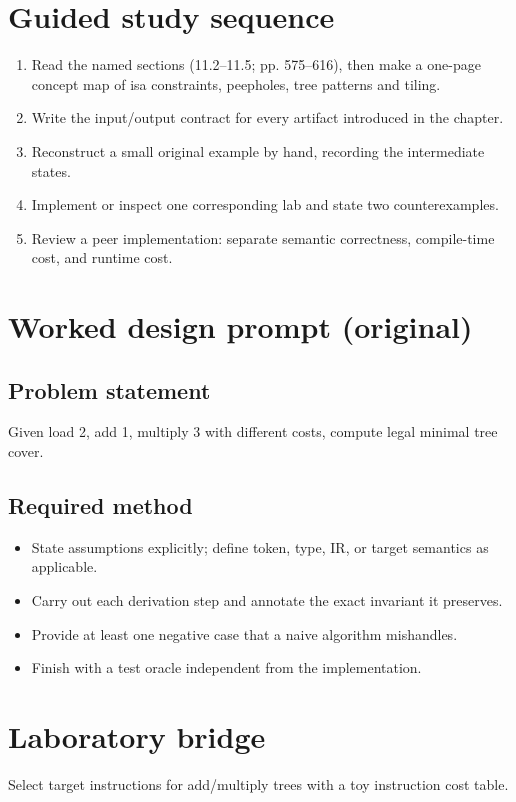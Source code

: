\documentclass[10pt,letterpaper]{article}
\begin{document}
\section{Guided study sequence}
\begin{enumerate}
\item Read the named sections (11.2--11.5; pp. 575--616), then make a one-page concept map of isa constraints, peepholes, tree patterns and tiling.
\item Write the input/output contract for every artifact introduced in the chapter.
\item Reconstruct a small original example by hand, recording the intermediate states.
\item Implement or inspect one corresponding lab and state two counterexamples.
\item Review a peer implementation: separate semantic correctness, compile-time cost, and runtime cost.
\end{enumerate}

\section{Worked design prompt (original)}
\subsection{Problem statement}
Given load 2, add 1, multiply 3 with different costs, compute legal minimal tree cover.
\subsection{Required method}
\begin{itemize}
\item State assumptions explicitly; define token, type, IR, or target semantics as applicable.
\item Carry out each derivation step and annotate the exact invariant it preserves.
\item Provide at least one negative case that a naive algorithm mishandles.
\item Finish with a test oracle independent from the implementation.
\end{itemize}


\section{Laboratory bridge}
Select target instructions for add/multiply trees with a toy instruction cost table.
\end{document}

